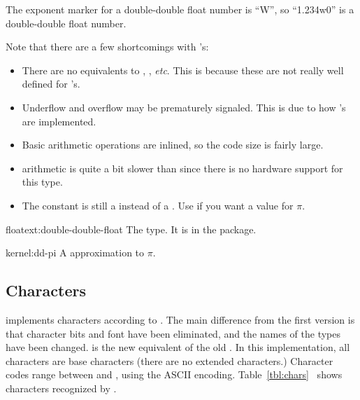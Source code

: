 The exponent marker for a double-double float number is ``W'', so
``1.234w0'' is a double-double float number.


Note that there are a few shortcomings with
's:
\begin{itemize}
 \item There are no equivalents to ,
   , \textit{etc}.  This is because
   these are not really well defined for 's.
 \item Underflow and overflow may be prematurely signaled.  This is
   due to how 's are implemented.
 \item Basic arithmetic operations are inlined, so the code size is
   fairly large.
 \item {} arithmetic is quite a bit slower
   than  since there is no hardware support for
   this type.
 \item The constant  is still a  instead
   of a .  Use  if you
   want a  value for $\pi$.
\end{itemize}

\begin{deftp}{float}{ext:double-double-float}{}
  The  type.  It is in the 
  package.
\end{deftp}

\begin{defconst}{kernel:}{dd-pi}
  A  approximation to $\pi$.
\end{defconst}

\subsection{Characters}

\cmucl{} implements characters according to \cltltwo{}. The
main difference from the first version is that character bits and font
have been eliminated, and the names of the types have been changed.
 is the new equivalent of the old
. In this implementation, all characters are
base characters (there are no extended characters.) Character codes
range between  and , using the ASCII encoding.
Table~\ref{tbl:chars}~ shows characters recognized
by \cmucl.

